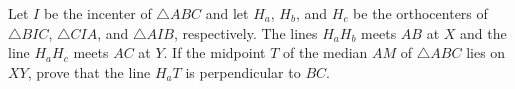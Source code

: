 Let $I$ be the incenter of $\triangle ABC$ and let $H_a$,  $H_b$,  and $H_c$ be the orthocenters of $\triangle BIC$, $\triangle CIA$,  and $\triangle AIB$,  respectively. The lines $H_aH_b$ meets $AB$ at $X$ and the line $H_aH_c$ meets $AC$ at $Y$. If the midpoint $T$ of the median $AM$ of $\triangle ABC$ lies on $XY$,  prove that the line $H_aT$ is perpendicular to $BC$.

